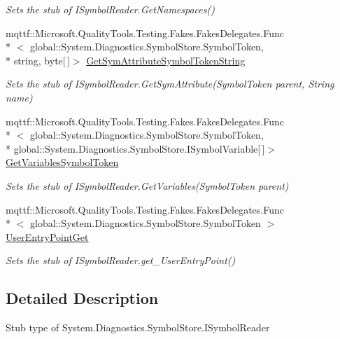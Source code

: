 \begin{DoxyCompactItemize}
\begin{DoxyCompactList}\small\item\em Sets the stub of I\-Symbol\-Reader.\-Get\-Namespaces()\end{DoxyCompactList}\item 
mqttf\-::\-Microsoft.\-Quality\-Tools.\-Testing.\-Fakes.\-Fakes\-Delegates.\-Func\\*
$<$ global\-::\-System.\-Diagnostics.\-Symbol\-Store.\-Symbol\-Token, \\*
string, byte\mbox{[}$\,$\mbox{]}$>$ \hyperlink{class_system_1_1_diagnostics_1_1_symbol_store_1_1_fakes_1_1_stub_i_symbol_reader_ada7837a4249c9430fd5f90c98c42f5b2}{Get\-Sym\-Attribute\-Symbol\-Token\-String}
\begin{DoxyCompactList}\small\item\em Sets the stub of I\-Symbol\-Reader.\-Get\-Sym\-Attribute(\-Symbol\-Token parent, String name)\end{DoxyCompactList}\item 
mqttf\-::\-Microsoft.\-Quality\-Tools.\-Testing.\-Fakes.\-Fakes\-Delegates.\-Func\\*
$<$ global\-::\-System.\-Diagnostics.\-Symbol\-Store.\-Symbol\-Token, \\*
global\-::\-System.\-Diagnostics.\-Symbol\-Store.\-I\-Symbol\-Variable\mbox{[}$\,$\mbox{]}$>$ \hyperlink{class_system_1_1_diagnostics_1_1_symbol_store_1_1_fakes_1_1_stub_i_symbol_reader_ab83553b6062d5509f6504a338d151c9e}{Get\-Variables\-Symbol\-Token}
\begin{DoxyCompactList}\small\item\em Sets the stub of I\-Symbol\-Reader.\-Get\-Variables(\-Symbol\-Token parent)\end{DoxyCompactList}\item 
mqttf\-::\-Microsoft.\-Quality\-Tools.\-Testing.\-Fakes.\-Fakes\-Delegates.\-Func\\*
$<$ global\-::\-System.\-Diagnostics.\-Symbol\-Store.\-Symbol\-Token $>$ \hyperlink{class_system_1_1_diagnostics_1_1_symbol_store_1_1_fakes_1_1_stub_i_symbol_reader_a15b7288967b7662c6b8540ba9e0da8ea}{User\-Entry\-Point\-Get}
\begin{DoxyCompactList}\small\item\em Sets the stub of I\-Symbol\-Reader.\-get\-\_\-\-User\-Entry\-Point()\end{DoxyCompactList}\end{DoxyCompactItemize}


\subsection{Detailed Description}
Stub type of System.\-Diagnostics.\-Symbol\-Store.\-I\-Symbol\-Reader



